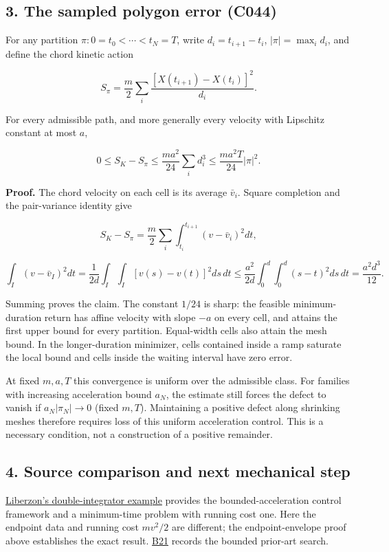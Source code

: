 \documentclass[11pt,a4paper]{article}
\begin{document}
\hypertarget{the-sampled-polygon-error-c044}{%
\subsection{3. The sampled polygon error
(C044)}\label{the-sampled-polygon-error-c044}}

For any partition \(\pi:0=t_0<\cdots<t_N=T\), write \(d_i=t_{i+1}-t_i\),
\(|\pi|=\max_i d_i\), and define the chord kinetic action

\[
S_\pi=\frac m2\sum_i\frac{[X(t_{i+1})-X(t_i)]^2}{d_i}.
\]

For every admissible path, and more generally every velocity with
Lipschitz constant at most \(a\),

\[
0\le S_K-S_\pi\le\frac{ma^2}{24}\sum_i d_i^3
\le\frac{ma^2T}{24}|\pi|^2.
\]

\textbf{Proof.} The chord velocity on each cell is its average
\(\bar v_i\). Square completion and the pair-variance identity give

\[
S_K-S_\pi=\frac m2\sum_i\int_{t_i}^{t_{i+1}}(v-\bar v_i)^2dt,
\]

\[
\int_I(v-\bar v_I)^2dt
=\frac1{2d}\int_I\int_I[v(s)-v(t)]^2ds\,dt
\le\frac{a^2}{2d}\int_0^d\int_0^d(s-t)^2ds\,dt
=\frac{a^2d^3}{12}.
\]

Summing proves the claim. The constant \(1/24\) is sharp: the feasible
minimum-duration return has affine velocity with slope \(-a\) on every
cell, and attains the first upper bound for every partition. Equal-width
cells also attain the mesh bound. In the longer-duration minimizer,
cells contained inside a ramp saturate the local bound and cells inside
the waiting interval have zero error.

At fixed \(m,a,T\) this convergence is uniform over the admissible
class. For families with increasing acceleration bound \(a_N\), the
estimate still forces the defect to vanish if \(a_N|\pi_N|\to0\) (fixed
\(m,T\)). Maintaining a positive defect along shrinking meshes therefore
requires loss of this uniform acceleration control. This is a necessary
condition, not a construction of a positive remainder.

\hypertarget{source-comparison-and-next-mechanical-step}{%
\subsection{4. Source comparison and next mechanical
step}\label{source-comparison-and-next-mechanical-step}}

\href{https://liberzon.csl.illinois.edu/teaching/cvoc/node85.html}{Liberzon's
double-integrator example} provides the bounded-acceleration control
framework and a minimum-time problem with running cost one. Here the
endpoint data and running cost \(mv^2/2\) are different; the
endpoint-envelope proof above establishes the exact result.
\href{../references/batches/B21.md}{B21} records the bounded prior-art
search.
\end{document}

